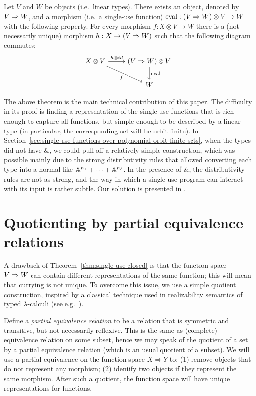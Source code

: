 \documentclass[a4paper,UKenglish,cleveref, autoref, numberwithinsect, thm-restate]{lipics-v2021}
\begin{document}
\begin{theorem}\label{thm:single-use-closed}
    Let $V$ and $W$ be objects (i.e.~linear types). There exists an object, denoted by  $V \Rightarrow W$, and a morphism (i.e.~a single-use function)
    $\mathrm{eval} : (V \Rightarrow W) \otimes V \to  W$
    with the following property. For every morphism
    $f : {X \otimes V} \to  W$
    there is a (not necessarily unique) morphism
    $h :  X \to (V \Rightarrow W)$
    such that the following diagram commutes:
    \[
    \begin{tikzcd}
    X \otimes V 
    \arrow[r,"h \otimes id"]
    \arrow[dr,"f"']
    &
    (\funspace V W) \otimes V
    \arrow[d,"\mathrm{eval}"] \\
    &
    W
    \end{tikzcd}
    \]
\end{theorem}

The above theorem is the main technical contribution of this paper. The difficulty in its proof is finding a representation of the single-use  functions that is rich enough to capture all functions, but simple enough to be described by a linear type (in particular, the corresponding set will be orbit-finite). In  Section~\ref{sec:single-use-functions-over-polynomial-orbit-finite-sets}, when the types did not have $\&$, we could pull off a relatively simple construction, which was possible mainly due to the strong distributivity rules that allowed converting each type into a normal like $\mathbb A^{n_1} + \cdots + \mathbb A^{n_\ell}$. In the presence of $\&$, the distributivity rules are not as strong, and the way in which a single-use program can interact with its input is rather subtle. 
Our solution is presented in .

\section{Quotienting by partial equivalence relations}
\label{sec:quotient-category}
A drawback of Theorem~\ref{thm:single-use-closed} is that the function space $V \Rightarrow W$ can contain different representations of the same function; this will mean that currying is not unique. To overcome this issue, we use a simple quotient construction, inspired by a classical technique used in realizability semantics of typed $\lambda$-calculi (see e.g.~\cite[Chapter~15]{AmadioCurien}).

Define a \emph{partial equivalence relation} to be a relation that is symmetric and transitive, but not necessarily reflexive.  This is the same as (complete) equivalence relation on some subset, hence we may speak of the quotient of a set by a partial equivalence relation (which is an usual quotient of a subset). We will use a partial equivalence on the function space $X \Rightarrow Y$ to: (1)
 remove objects that do not represent any morphism; (2) identify two objects if they represent the same morphism. After such a quotient, the function space will have unique representations for functions. 
\end{document}
